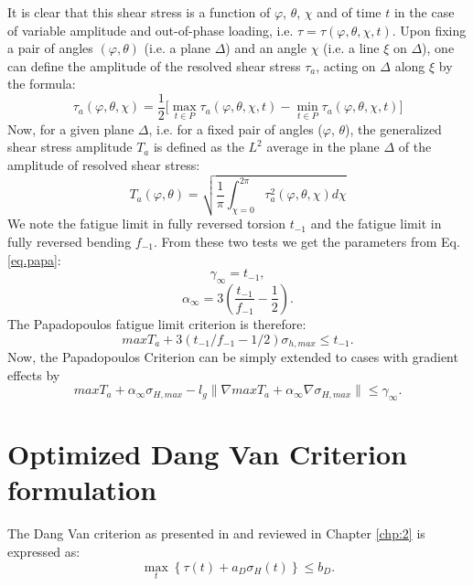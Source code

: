 It is clear that this shear stress is a function of
$\varphi$, $\theta$, $\chi$ and of time $t$ in the case of variable amplitude and out-of-phase loading, i.e. $\tau=\tau(\varphi, \theta, \chi, t)$. Upon fixing a pair of angles $(\varphi, \theta)$ (i.e. a plane
$\Delta$) and an angle $\chi$ (i.e. a line $\xi$ on $\Delta$), one can define the amplitude of the resolved shear stress $\tau_a$, acting on $\Delta$
along $\xi$ by the formula:
\begin{equation}
	\tau_a(\varphi,\theta,\chi)=\dfrac{1}{2}\big[\max \limits_{t\in P}\tau_a(\varphi,\theta,\chi ,t)-\min \limits_{t\in P}\tau_a(\varphi,\theta,\chi ,t)\big]
\end{equation}
Now, for a given plane $\Delta$, i.e. for a fixed pair of angles ($\varphi$, $\theta$),
the generalized shear stress amplitude $T_a$ is defined as the $L^2$ average in the plane $\Delta$ of the amplitude of resolved shear stress:
\begin{equation}
	T_a(\varphi,\theta)=\sqrt{\dfrac{1}{\pi}\int_{\chi=0}^{2\pi} \tau_a^2(\varphi,\theta,\chi)d\chi}
	\label{Ta}
\end{equation}
We note the fatigue limit in fully reversed torsion $t_{-1}$ and the fatigue limit in fully reversed bending $f_{-1}$. From these two tests we get the parameters from Eq.\eqref{eq.papa}:
$$\gamma_\infty=t_{-1},$$ 
$$\alpha_\infty=3\left( \dfrac{t_{-1}}{f_{-1}}-\dfrac{1}{2}\right) .$$
The Papadopoulos fatigue limit criterion is therefore:
\begin{equation}
	maxT_a+3\left( t_{-1}/f_{-1}-1/2\right) \sigma_{h,max}\leqslant t_{-1}.
	\label{eq:papadopoulos}
\end{equation}
Now,  the Papadopoulos Criterion can be simply extended  to cases with gradient effects by
\begin{equation}
	maxT_a+\alpha_\infty\sigma_{H,max}-l_g\parallel\nabla{maxT_a}+\alpha_\infty\nabla\sigma_{H,max}\parallel\leqslant \gamma_\infty .
	\label{eq:modified papa}
\end{equation}

\section{Optimized Dang Van Criterion formulation}
The Dang Van criterion as presented in \cite{ballard1995high} and reviewed in Chapter \ref{chp:2} is expressed as:
\begin{equation}
	 \max \limits_{t}\left\{\tau{(t)}+a_D\sigma_H(t)\right\} \leqslant b_D.
	\label{dv}
\end{equation}

